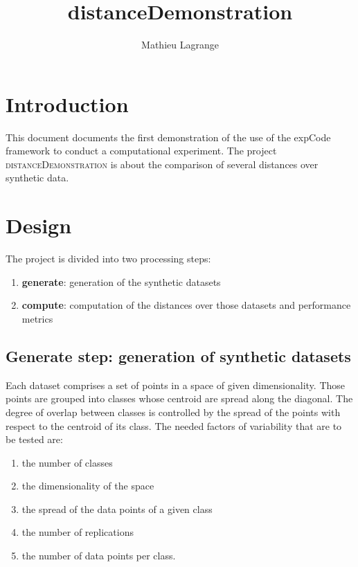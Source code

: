 \documentclass[12pt,a4paper,fleqn]{tufte-handout}
\title{distanceDemonstration}
\author{ Mathieu Lagrange }
\begin{document}
 
  
\maketitle 
  

\section{Introduction}

This document documents the first demonstration of the use of the expCode framework to conduct a computational experiment. The project \textsc{distanceDemonstration} is about the comparison of several distances over synthetic data.

\section{Design}

 The project is divided into two processing steps:
\begin{enumerate}
\item \textbf{generate}: generation of the synthetic datasets
\item \textbf{compute}: computation of the distances over those datasets and performance metrics
\end{enumerate}

\subsection{\textbf{Generate step}: generation of synthetic datasets}

Each dataset comprises a set of points in a space of given dimensionality. Those points are grouped into classes whose centroid are spread along the diagonal. The degree of overlap between classes is controlled by the spread of the points with respect to the centroid of its class. The needed factors of variability that are to be tested are:
\begin{enumerate}
\item the number of classes
\item the dimensionality of the space
\item the spread of the data points of a given class
\item the number of replications
\item the number of data points per class.
\end{enumerate}
\end{document}
